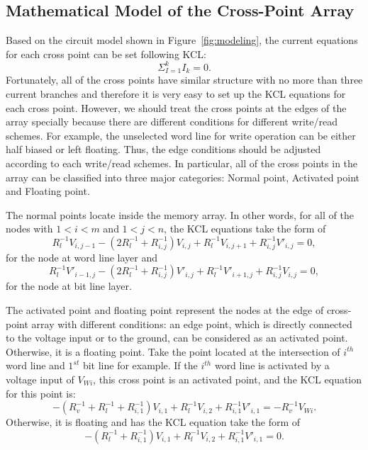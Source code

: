 \subsection{Mathematical Model of the Cross-Point Array}
Based on the circuit model shown in Figure~\ref{fig:modeling}, the current equations for each cross point can be set following KCL:
\begin{equation}
  {\Sigma}_{I=1}^kI_k=0.
\end{equation}
Fortunately, all of the cross points have similar structure with no more than three current branches and therefore it is very easy to set up the KCL equations for each cross point. However, we should treat the cross points at the edges of the array specially because there are different conditions for different write/read schemes. For example, the unselected word line for write operation can be either half biased or left floating. Thus, the edge conditions should be adjusted according to each write/read schemes. In particular, all of the cross points in the array can be classified into three major categories: Normal point, Activated point and Floating point.

The normal points locate inside the memory array. In other words, for all of the nodes with $1<i<m$ and $1<j<n$, the KCL equations take the form of
\begin{equation}\label{equ:KCL1}
R_l^{-1}V_{i,j-1} -(2R_l^{-1}+R_{i,j}^{-1})V_{i,j}+ R_l^{-1}V_{i,j+1}+R_{i,j}^{-1}V'_{i,j}=0,
\end{equation}
for the node at word line layer and
\begin{equation}\label{equ:KCL2}
R_l^{-1}V'_{i-1,j} -(2R_l^{-1}+R_{i,j}^{-1})V'_{i,j}+ R_l^{-1}V'_{i+1,j}+R_{i,j}^{-1}V_{i,j}=0,
\end{equation}
for the node at bit line layer.

The activated point and floating point represent the nodes at the edge of cross-point array with different conditions: an edge point, which is directly connected to the voltage input or to the ground, can be considered as an activated point. Otherwise, it is a floating point. Take the point located at the intersection of $i^{th}$ word line and $1^{st}$ bit line for example. If the $i^{th}$ word line is activated by a voltage input of $V_{Wi}$, this cross point is an activated point, and the KCL equation for this point is:
\begin{equation}\label{equ:KCL3}
-(R_v^{-1}+R_l^{-1}+R_{i,1}^{-1})V_{i,1}+ R_l^{-1}V_{i,2}+R_{i,1}^{-1}V'_{i,1}=-R_v^{-1}V_{Wi}.
\end{equation}
Otherwise, it is floating and has the KCL equation take the form of
\begin{equation}\label{equ:KCL4}
-(R_l^{-1}+R_{i,1}^{-1})V_{i,1}+ R_l^{-1}V_{i,2}+R_{i,1}^{-1}V'_{i,1}=0.
\end{equation}

